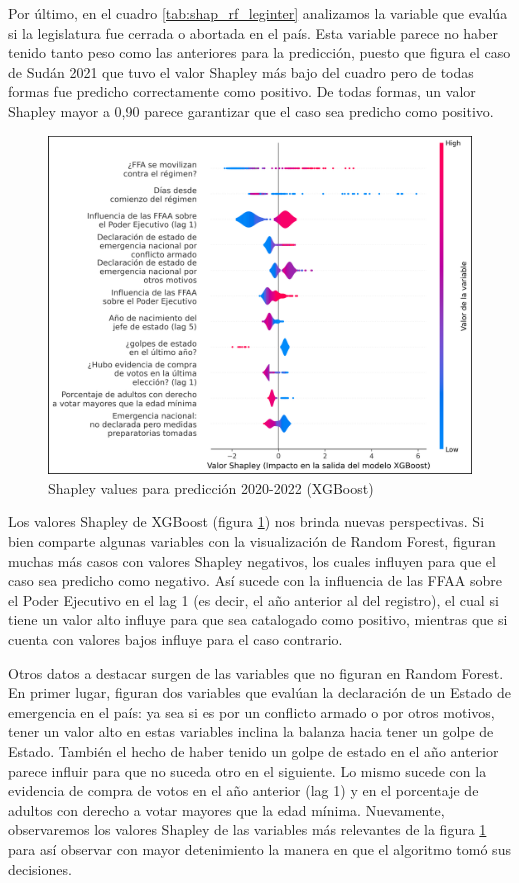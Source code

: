 \documentclass{article}
\begin{document}
Por último, en el cuadro \ref{tab:shap_rf_leginter} analizamos la variable que evalúa si la legislatura 
fue cerrada o abortada en el país. Esta variable parece no haber tenido tanto peso como las anteriores 
para la predicción, puesto que figura el caso de Sudán 2021 que tuvo el valor Shapley más bajo del 
cuadro pero de todas formas fue predicho correctamente como positivo. De todas formas, un valor Shapley
mayor a 0,90 parece garantizar que el caso sea predicho como positivo.

\begin{figure}[H]
 \centering
 \includegraphics[width=1\textwidth]{10_shapley_values_xgb.png}
 \caption{Shapley values para predicción 2020-2022 (XGBoost)\label{fig:shapley_xgb}}
\end{figure}

Los valores Shapley de XGBoost (figura \ref{fig:shapley_xgb}) nos brinda nuevas perspectivas. 
Si bien comparte algunas variables con la visualización de Random Forest, figuran muchas más
casos con valores Shapley negativos, los cuales influyen para que el caso sea predicho como negativo. 
Así sucede con la influencia de las FFAA sobre el Poder Ejecutivo en el lag 1 (es decir, el año 
anterior al del registro), el cual si tiene un valor alto influye para que sea catalogado como 
positivo, mientras que si cuenta con valores bajos influye para el caso contrario.

Otros datos a destacar surgen de las variables que no figuran en Random Forest. En primer lugar,
figuran dos variables que evalúan la declaración de un Estado de emergencia en el país: ya sea si es 
por un conflicto armado o por otros motivos, tener un valor alto en estas variables inclina la balanza 
hacia tener un golpe de Estado. También el hecho de haber tenido un golpe de estado en el año anterior 
parece influir para que no suceda otro en el siguiente. Lo mismo sucede con la evidencia de compra de 
votos en el año anterior (lag 1) y en el porcentaje de adultos con derecho a votar mayores que la edad 
mínima. Nuevamente, observaremos los valores Shapley de las variables más relevantes de la figura
\ref{fig:shapley_xgb} para así observar con mayor detenimiento la manera en que el algoritmo tomó
sus decisiones.
\end{document}
